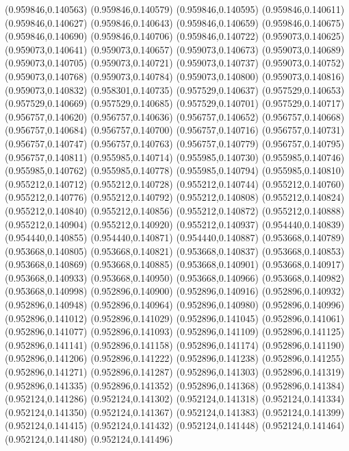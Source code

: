 (0.959846,0.140563)
(0.959846,0.140579)
(0.959846,0.140595)
(0.959846,0.140611)
(0.959846,0.140627)
(0.959846,0.140643)
(0.959846,0.140659)
(0.959846,0.140675)
(0.959846,0.140690)
(0.959846,0.140706)
(0.959846,0.140722)
(0.959073,0.140625)
(0.959073,0.140641)
(0.959073,0.140657)
(0.959073,0.140673)
(0.959073,0.140689)
(0.959073,0.140705)
(0.959073,0.140721)
(0.959073,0.140737)
(0.959073,0.140752)
(0.959073,0.140768)
(0.959073,0.140784)
(0.959073,0.140800)
(0.959073,0.140816)
(0.959073,0.140832)
(0.958301,0.140735)
(0.957529,0.140637)
(0.957529,0.140653)
(0.957529,0.140669)
(0.957529,0.140685)
(0.957529,0.140701)
(0.957529,0.140717)
(0.956757,0.140620)
(0.956757,0.140636)
(0.956757,0.140652)
(0.956757,0.140668)
(0.956757,0.140684)
(0.956757,0.140700)
(0.956757,0.140716)
(0.956757,0.140731)
(0.956757,0.140747)
(0.956757,0.140763)
(0.956757,0.140779)
(0.956757,0.140795)
(0.956757,0.140811)
(0.955985,0.140714)
(0.955985,0.140730)
(0.955985,0.140746)
(0.955985,0.140762)
(0.955985,0.140778)
(0.955985,0.140794)
(0.955985,0.140810)
(0.955212,0.140712)
(0.955212,0.140728)
(0.955212,0.140744)
(0.955212,0.140760)
(0.955212,0.140776)
(0.955212,0.140792)
(0.955212,0.140808)
(0.955212,0.140824)
(0.955212,0.140840)
(0.955212,0.140856)
(0.955212,0.140872)
(0.955212,0.140888)
(0.955212,0.140904)
(0.955212,0.140920)
(0.955212,0.140937)
(0.954440,0.140839)
(0.954440,0.140855)
(0.954440,0.140871)
(0.954440,0.140887)
(0.953668,0.140789)
(0.953668,0.140805)
(0.953668,0.140821)
(0.953668,0.140837)
(0.953668,0.140853)
(0.953668,0.140869)
(0.953668,0.140885)
(0.953668,0.140901)
(0.953668,0.140917)
(0.953668,0.140933)
(0.953668,0.140950)
(0.953668,0.140966)
(0.953668,0.140982)
(0.953668,0.140998)
(0.952896,0.140900)
(0.952896,0.140916)
(0.952896,0.140932)
(0.952896,0.140948)
(0.952896,0.140964)
(0.952896,0.140980)
(0.952896,0.140996)
(0.952896,0.141012)
(0.952896,0.141029)
(0.952896,0.141045)
(0.952896,0.141061)
(0.952896,0.141077)
(0.952896,0.141093)
(0.952896,0.141109)
(0.952896,0.141125)
(0.952896,0.141141)
(0.952896,0.141158)
(0.952896,0.141174)
(0.952896,0.141190)
(0.952896,0.141206)
(0.952896,0.141222)
(0.952896,0.141238)
(0.952896,0.141255)
(0.952896,0.141271)
(0.952896,0.141287)
(0.952896,0.141303)
(0.952896,0.141319)
(0.952896,0.141335)
(0.952896,0.141352)
(0.952896,0.141368)
(0.952896,0.141384)
(0.952124,0.141286)
(0.952124,0.141302)
(0.952124,0.141318)
(0.952124,0.141334)
(0.952124,0.141350)
(0.952124,0.141367)
(0.952124,0.141383)
(0.952124,0.141399)
(0.952124,0.141415)
(0.952124,0.141432)
(0.952124,0.141448)
(0.952124,0.141464)
(0.952124,0.141480)
(0.952124,0.141496)
